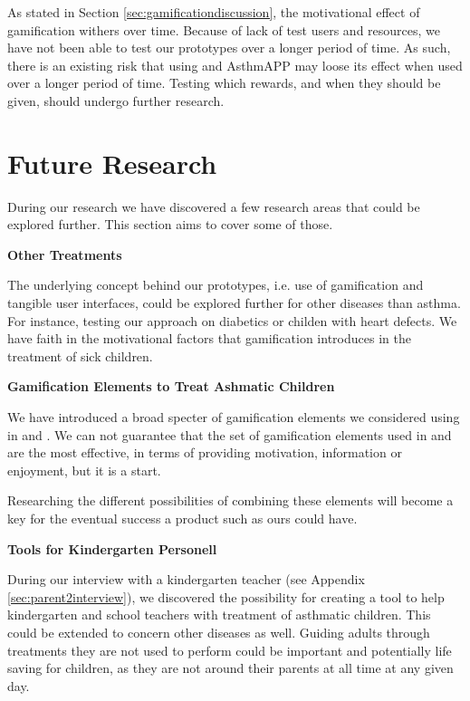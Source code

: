 As stated in Section \ref{sec:gamificationdiscussion}, the motivational effect of gamification withers over time. Because of lack of test users and resources, we have not been able to test our prototypes over a longer period of time. As such, there is an existing risk that using \buddy{} and AsthmAPP may loose its effect when used over a longer period of time. Testing which rewards, and when they should be given, should undergo further research.   

\section{Future Research}
\label{sec:futureresearch}

During our research we have discovered a few research areas that could be explored further. This section aims to cover some of those. 

\textbf{Other Treatments}

The underlying concept behind our prototypes, i.e. use of gamification and tangible user interfaces, could be explored further for other diseases than asthma. For instance, testing our approach on diabetics or childen with heart defects. We have faith in the motivational factors that gamification introduces in the treatment of sick children. 

\textbf{Gamification Elements to Treat Ashmatic Children}

We have introduced a broad specter of gamification elements we considered using in \app{} and \ab{}. We can not guarantee that the set of gamification elements used in \app{} and \ab{} are the most effective, in terms of providing motivation, information or enjoyment, but it is a start. 

Researching the different possibilities of combining these elements will become a key for the eventual success a product such as ours could have.    


\textbf{Tools for Kindergarten Personell}

During our interview with a kindergarten teacher (see Appendix \ref{sec:parent2interview}), we discovered the possibility for creating a tool to help kindergarten and school teachers with treatment of asthmatic children. This could be extended to concern other diseases as well. Guiding adults through treatments they are not used to perform could be important and potentially life saving for children, as they are not around their parents at all time at any given day.    

